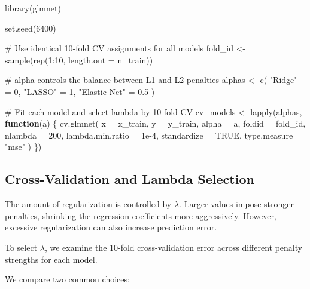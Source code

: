 \documentclass[
  letterpaper,
  DIV=11,
  numbers=noendperiod]{scrreprt}
\newenvironment{Shaded}{\begin{snugshade}}{\end{snugshade}}
\newcommand{\AttributeTok}[1]{\textcolor[rgb]{0.40,0.45,0.13}{#1}}
\newcommand{\CommentTok}[1]{\textcolor[rgb]{0.37,0.37,0.37}{#1}}
\newcommand{\ConstantTok}[1]{\textcolor[rgb]{0.56,0.35,0.01}{#1}}
\newcommand{\ControlFlowTok}[1]{\textcolor[rgb]{0.00,0.23,0.31}{\textbf{#1}}}
\newcommand{\DecValTok}[1]{\textcolor[rgb]{0.68,0.00,0.00}{#1}}
\newcommand{\FloatTok}[1]{\textcolor[rgb]{0.68,0.00,0.00}{#1}}
\newcommand{\FunctionTok}[1]{\textcolor[rgb]{0.28,0.35,0.67}{#1}}
\newcommand{\NormalTok}[1]{\textcolor[rgb]{0.00,0.23,0.31}{#1}}
\newcommand{\OtherTok}[1]{\textcolor[rgb]{0.00,0.23,0.31}{#1}}
\newcommand{\SpecialCharTok}[1]{\textcolor[rgb]{0.37,0.37,0.37}{#1}}
\newcommand{\StringTok}[1]{\textcolor[rgb]{0.13,0.47,0.30}{#1}}
\begin{document}
\begin{Shaded}
\begin{Highlighting}[]
\FunctionTok{library}\NormalTok{(glmnet)}

\FunctionTok{set.seed}\NormalTok{(}\DecValTok{6400}\NormalTok{)}

\CommentTok{\# Use identical 10{-}fold CV assignments for all models}
\NormalTok{fold\_id }\OtherTok{\textless{}{-}} \FunctionTok{sample}\NormalTok{(}\FunctionTok{rep}\NormalTok{(}\DecValTok{1}\SpecialCharTok{:}\DecValTok{10}\NormalTok{, }\AttributeTok{length.out =}\NormalTok{ n\_train))}

\CommentTok{\# alpha controls the balance between L1 and L2 penalties}
\NormalTok{alphas }\OtherTok{\textless{}{-}} \FunctionTok{c}\NormalTok{(}
  \StringTok{"Ridge"} \OtherTok{=} \DecValTok{0}\NormalTok{,}
  \StringTok{"LASSO"} \OtherTok{=} \DecValTok{1}\NormalTok{,}
  \StringTok{"Elastic Net"} \OtherTok{=} \FloatTok{0.5}
\NormalTok{)}

\CommentTok{\# Fit each model and select lambda by 10{-}fold CV}
\NormalTok{cv\_models }\OtherTok{\textless{}{-}} \FunctionTok{lapply}\NormalTok{(alphas, }\ControlFlowTok{function}\NormalTok{(a) \{}
  \FunctionTok{cv.glmnet}\NormalTok{(}
    \AttributeTok{x =}\NormalTok{ x\_train,}
    \AttributeTok{y =}\NormalTok{ y\_train,}
    \AttributeTok{alpha =}\NormalTok{ a,}
    \AttributeTok{foldid =}\NormalTok{ fold\_id,}
    \AttributeTok{nlambda =} \DecValTok{200}\NormalTok{,}
    \AttributeTok{lambda.min.ratio =} \FloatTok{1e{-}4}\NormalTok{,}
    \AttributeTok{standardize =} \ConstantTok{TRUE}\NormalTok{,}
    \AttributeTok{type.measure =} \StringTok{"mse"}
\NormalTok{  )}
\NormalTok{\})}
\end{Highlighting}
\end{Shaded}

\subsection{Cross-Validation and Lambda
Selection}\label{cross-validation-and-lambda-selection}

The amount of regularization is controlled by \(\lambda\). Larger values
impose stronger penalties, shrinking the regression coefficients more
aggressively. However, excessive regularization can also increase
prediction error.

To select \(\lambda\), we examine the 10-fold cross-validation error
across different penalty strengths for each model.

We compare two common choices:
\end{document}
